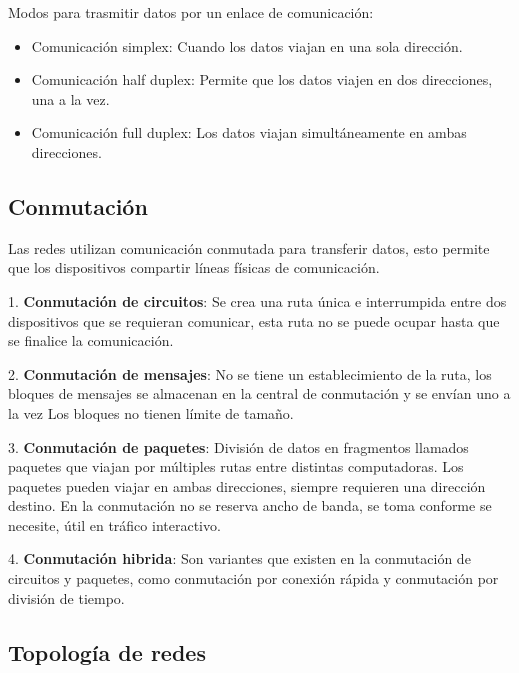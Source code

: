 Modos para trasmitir datos por un enlace de comunicación:
\begin{itemize}
	\item Comunicación simplex: Cuando los datos viajan en una sola dirección.
	\item Comunicación half duplex: Permite que los datos viajen en dos direcciones, una a la vez.
	\item Comunicación full duplex: Los datos viajan simultáneamente en ambas direcciones.
\end{itemize}
\vspace{1cm}

\begin{center}
\subsection{Conmutación}
\end{center}

Las redes utilizan comunicación conmutada para transferir datos, esto permite que los dispositivos compartir líneas físicas de comunicación.


1. \textbf{Conmutación de circuitos}: Se crea una ruta única e interrumpida entre dos dispositivos que se requieran comunicar, esta ruta no se puede ocupar hasta que se finalice la comunicación.

2. \textbf{Conmutación de mensajes}: No se tiene un establecimiento de la ruta, los bloques de mensajes se almacenan en la central de conmutación y se envían uno a la vez Los bloques no tienen límite de tamaño.

3. \textbf{Conmutación de paquetes}: División de datos en fragmentos llamados paquetes que viajan por múltiples rutas entre distintas computadoras. Los paquetes pueden viajar en ambas direcciones, siempre requieren una dirección destino. En la conmutación no se reserva ancho de banda, se toma conforme se necesite, útil en tráfico interactivo.

4. \textbf{Conmutación hibrida}: Son variantes que existen en la conmutación de circuitos y paquetes, como conmutación por conexión rápida y conmutación por división de tiempo.

\newpage

\begin{center}
\subsection{Topología de redes}
\end{center}


